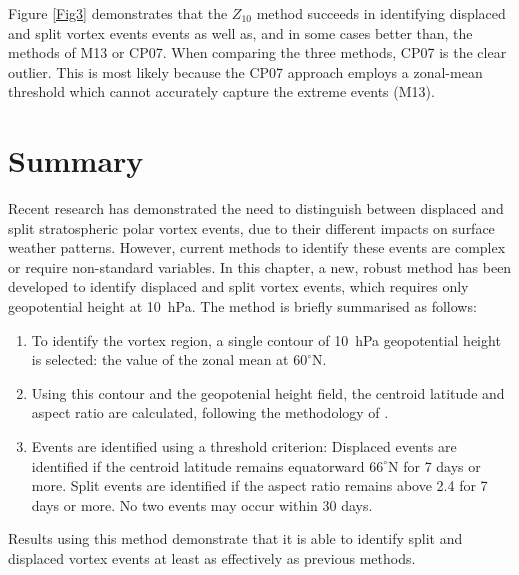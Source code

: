  Figure \ref{Fig3} demonstrates that the $Z_{10}$ method succeeds in identifying
 displaced and split vortex events events as well as, and in some cases better
 than, the methods of M13 or CP07. When comparing the three methods, CP07 is the
 clear outlier. This is most likely because the CP07 approach employs a
 zonal-mean threshold which cannot accurately capture the extreme events (M13).

\section{Summary}

Recent research has demonstrated the need to distinguish between displaced and
split stratospheric polar vortex events, due to their different impacts on
surface weather patterns. However, current methods to identify these events are
complex or require non-standard variables. In this chapter, a new, robust method
has been developed to identify displaced and split vortex events, which requires
only geopotential height at 10~hPa. The method is briefly summarised as follows:
 \begin{enumerate}
 \item To identify the vortex region, a single contour of 10~hPa geopotential
   height is selected: the value of the zonal mean at $60^{\circ}$N.
 \item Using this contour and the geopotenial height field, the centroid
   latitude and aspect ratio are calculated, following the methodology of
   \cite{Matthewman2009}.
 \item Events are identified using a threshold criterion: Displaced events are
   identified if the centroid latitude remains equatorward $66^{\circ}$N for 7
   days or more. Split events are identified if the aspect ratio remains above
   2.4 for 7 days or more. No two events may occur within 30 days.
 \end{enumerate}

 Results using this method demonstrate that it is able to identify split and
 displaced vortex events at least as effectively as previous methods.

\pagebreak

